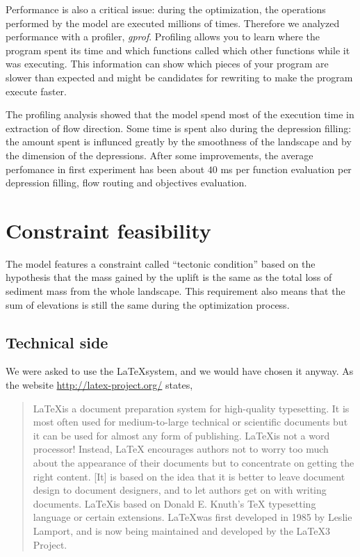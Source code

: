 Performance is also a critical issue: during the optimization, the
operations performed by the model are executed millions of times.
Therefore we analyzed performance with a profiler,
\emph{gprof}. Profiling allows you to learn where the program
spent its time and which functions called which other functions
while it was executing. This information can show which pieces of
your program are slower than expected and might be candidates for
rewriting to make the program execute faster.

The profiling analysis showed that the model spend most of the
execution time in extraction of flow direction. Some time is spent
also during the depression filling: the amount spent is influnced
greatly by the smoothness of the landscape and by the dimension of
the depressions. After some improvements, the average perfomance
in first experiment has been about $40$ ms per function
evaluation \ie per depression filling, flow routing and objectives
evaluation.

\section{Constraint feasibility}
\label{appChap:constraint}
The model features a constraint called
\enquote{tectonic condition} based on the hypothesis that the
mass gained by the uplift is the same as the total loss of sediment
mass from the whole landscape. This requirement also means that
the sum of elevations is still the same during the optimization
process.



\subsection{Technical side}
We were asked to use the \LaTeX system, and we would have chosen
it anyway.
As the website \url{http://latex-project.org/} states, \blockquote{
\LaTeX is a document preparation system for high-quality
typesetting. It is most often used for medium-to-large technical
or scientific documents but it can be used for almost any form of
publishing. \LaTeX is not a word processor! Instead, \LaTeX
encourages authors not to worry too much about the appearance of
their documents but to concentrate on getting the right content.
[It] is based on the idea that it is better to leave document
design to document designers, and to let authors get on with
writing documents. \LaTeX is based on Donald E. Knuth's \TeX
typesetting language or certain extensions. \LaTeX was first
developed in 1985 by Leslie Lamport, and is now being maintained
and developed by the \LaTeX3 Project.}

